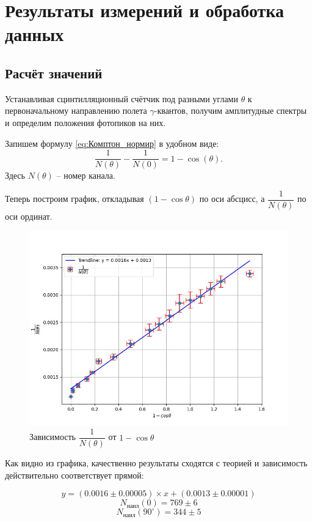 \documentclass[a4paper,12pt]{article} %
\begin{document}
\section * {Результаты измерений и обработка данных}
\subsection * {Расчёт значений}

Устанавливая сцинтилляционный счётчик под разными углами $\theta$ к первоначальному направлению полета $\gamma$-квантов, получим амплитудные спектры и определим положения фотопиков на них. 

Запишем формулу \eqref{eq:Комптон_нормир} в удобном виде:
	\begin{equation}\label{eq:Комптон_число}
		\dfrac{1}{N(\theta)} - \dfrac{1}{N(0)} = 1- \cos(\theta).
	\end{equation}
	Здесь $ N(\theta) $ -- номер канала.

 Теперь построим график, откладывая $(1 - \cos{\theta})$ по оси абсцисс, а $\dfrac{1}{N(\theta)}$ по оси ординат.

 \begin{figure}[h!]
     \centering
     \includegraphics[width=1\linewidth]{plot.jpg}
     \caption{Зависимость $\dfrac{1}{N(\theta)}$ от $1 - \cos{\theta}$}
     \label{fig:plot}
 \end{figure}

Как видно из графика, качественно результаты сходятся с теорией и зависимость действительно соответствует прямой:

\[y = (0.0016\pm 0.00005)\times x + (0.0013\pm 0.00001)\]
\[N_{наил}(0) = 769 \pm 6\]
\[N_{наил}(90^\circ) = 344\pm 5\]
	
\end{document}
